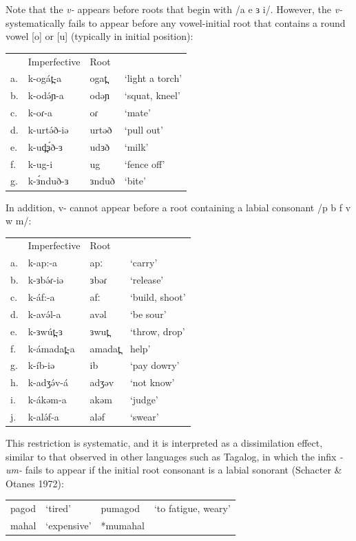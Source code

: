 Note that the \textit{v-} appears before roots that begin with /a e ɜ i/. However, the \textit{v-} systematically fails to appear before any vowel-initial root that contains a round vowel [o] or [u] (typically in initial position):

\ea
\begin{tabular}[t]{llll}
&	 	Imperfective	&	Root\\
	a.&	k-ogát̪-a	&	ogat̪	&	‘light a torch’	\\
	b.&	k-odə́ɲ-a		&	odəɲ	&	‘squat, kneel’\\
	c.&	k-oɾ-a		&	oɾ		&	‘mate’\\
	d.&	k-urtə́ð-iə	&	urtəð	&	‘pull out’\\
	e.&	k-ud̪ɜ́ð-ɜ	&	udɜð	&	‘milk’\\
	f.&	k-ug-i		&	ug		&	‘fence off’\\
	g.&	k-ɜ́nduð-ɜ	&	ɜnduð	&	‘bite’\\
\end{tabular}
\z

In addition, v- cannot appear before a root containing a labial consonant /p b f v w m/:

\ea
\begin{tabular}[t]{llll}
&	 	Imperfective	&	Root\\
a.&	k-ap:-a		&	apː		&	‘carry’\\
b.&	k-ɜbə́ɾ-iə	&	ɜbəɾ	&	‘release’\\
c.&	k-áf:-a		&	afː		&	‘build, shoot’\\
d.&	k-avə́l-a		&	avəl		&	‘be sour’\\
e.&	k-ɜwút̪-ɜ	&	ɜwut̪	&	‘throw, drop’\\
f.&	k-ámadat̪-a	&	amadat̪	&	help’\\
g.&	k-íb-iə		&	ib		&	‘pay dowry’\\
h.&	k-adʒə́v-á	&	adʒəv	&	‘not know’\\
i.&	k-ákəm-a	&	akəm		&	‘judge’\\
j.&	k-alə́f-a		&	aləf		&	‘swear’\\
\end{tabular}
\z

This restriction is systematic, and it is interpreted as a dissimilation effect, similar to that observed in other languages such as Tagalog, in which the infix \textit{-um-} fails to appear if the initial root consonant is a labial sonorant (Schacter \& Otanes 1972):

\ea
\begin{tabular}[t]{llll}
pagod &		‘tired’ 	&	pumagod 		&	‘to fatigue, weary’ \\
mahal &		‘expensive’ &	*mumahal \\
\end{tabular}
\z

